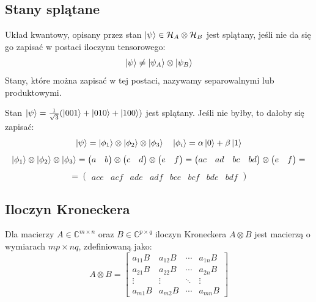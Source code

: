 \documentclass{../notatki}
\begin{document}
\subsection{Stany splątane}

Układ kwantowy, opisany przez stan $\ket{\psi} \in \mathcal{H}_A
\otimes \mathcal{H}_B$ jest splątany, jeśli nie da się go zapisać w postaci
iloczynu tensorowego:
$$
\ket{\psi} \neq \ket{\psi_A} \otimes \ket{\psi_B}
$$
Stany, które można zapisać w tej postaci, nazywamy separowalnymi lub
produktowymi.

\begin{examplebox}
  Stan $\ket{\psi} = \frac{1}{\sqrt{3}} (\ket{001} + \ket{010} + \ket{100})$
  jest splątany. Jeśli nie byłby, to dałoby się zapisać:
  $$
  \ket{\psi} = \ket{\phi_1} \otimes \ket{\phi_2} \otimes \ket{\phi_3}
  \quad \ket{\phi_i} = \alpha \ket{0} + \beta \ket{1}
  $$
  $$
  \ket{\phi_1} \otimes \ket{\phi_2} \otimes \ket{\phi_3} =
  \begin{pmatrix}
    a & b
  \end{pmatrix}
  \otimes
  \begin{pmatrix}
    c & d
  \end{pmatrix}
  \otimes
  \begin{pmatrix}
    e & f
  \end{pmatrix}
  =
  \begin{pmatrix}
    ac & ad & bc & bd
  \end{pmatrix}
  \otimes
  \begin{pmatrix}
    e & f
  \end{pmatrix}
  =
  $$
  $$
  =
  \begin{pmatrix}
    ace & acf & ade & adf & bce & bcf & bde & bdf
  \end{pmatrix}
  $$
\end{examplebox}

\subsection{Iloczyn Kroneckera}

Dla macierzy $A \in \mathbb{C}^{m \times n}$ oraz $B \in
\mathbb{C}^{p \times q}$ iloczyn Kroneckera $A \otimes B$ jest macierzą o
wymiarach $mp \times nq$, zdefiniowaną jako:
$$
A \otimes B =
\begin{bmatrix}
  a_{11}B & a_{12}B & \cdots & a_{1n}B \\
  a_{21}B & a_{22}B & \cdots & a_{2n}B \\
  \vdots & \vdots & \ddots & \vdots \\
  a_{m1}B & a_{m2}B & \cdots & a_{mn}B
\end{bmatrix}
$$
\end{document}
